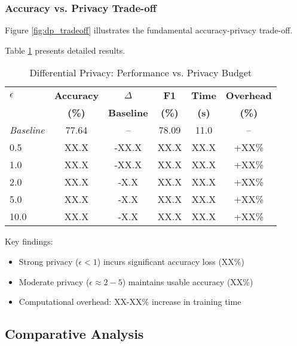 \documentclass[conference]{IEEEtran}
\begin{document}
\subsubsection{Accuracy vs. Privacy Trade-off}

Figure \ref{fig:dp_tradeoff} illustrates the fundamental accuracy-privacy trade-off.


Table \ref{tab:dp_results} presents detailed results.

\begin{table}[htbp]
\centering
\caption{Differential Privacy: Performance vs. Privacy Budget}
\label{tab:dp_results}
\begin{tabular}{@{}lccccc@{}}
\toprule
\textbf{$\epsilon$} & \textbf{Accuracy} & \textbf{$\Delta$} & \textbf{F1} & \textbf{Time} & \textbf{Overhead} \\
 & \textbf{(\%)} & \textbf{Baseline} & \textbf{(\%)} & \textbf{(s)} & \textbf{(\%)} \\ \midrule
\textit{Baseline} & 77.64 & -- & 78.09 & 11.0 & -- \\
0.5  & XX.X & -XX.X & XX.X & XX.X & +XX\% \\
1.0  & XX.X & -XX.X & XX.X & XX.X & +XX\% \\
2.0  & XX.X & -X.X & XX.X & XX.X & +XX\% \\
5.0  & XX.X & -X.X & XX.X & XX.X & +XX\% \\
10.0 & XX.X & -X.X & XX.X & XX.X & +XX\% \\ \bottomrule
\end{tabular}
\end{table}

Key findings:
\begin{itemize}
    \item Strong privacy ($\epsilon < 1$) incurs significant accuracy loss (XX\%)
    \item Moderate privacy ($\epsilon \approx 2-5$) maintains usable accuracy (XX\%)
    \item Computational overhead: XX-XX\% increase in training time
\end{itemize}

\subsection{Comparative Analysis}
\end{document}
